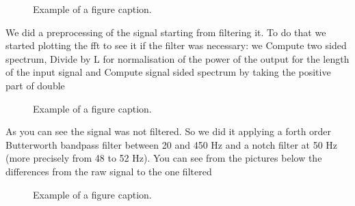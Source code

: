 \documentclass[journal]{IEEEtran}
\begin{document}
\begin{figure}[h]
	\caption{Example of a figure caption.}
	\label{fig1}
\end{figure}

We did a preprocessing of the signal starting from filtering it. To do that we started plotting the fft to see it if the filter was necessary: we Compute two sided spectrum, Divide by L for normalisation of the power of the output for the length of the input signal and Compute signal sided spectrum by taking the positive part of double

\begin{figure}[h]
	\caption{Example of a figure caption.}
	\label{fig2}
\end{figure}
As you can see the signal was not filtered. So we did it applying a forth order Butterworth bandpass filter between 20 and 450 Hz and a notch filter at 50 Hz (more precisely from 48 to 52 Hz).
You can see from the pictures below the differences from the raw signal to the one filtered
\begin{figure}[h]
	\caption{Example of a figure caption.}
	\label{fig3}
\end{figure}
\end{document}
